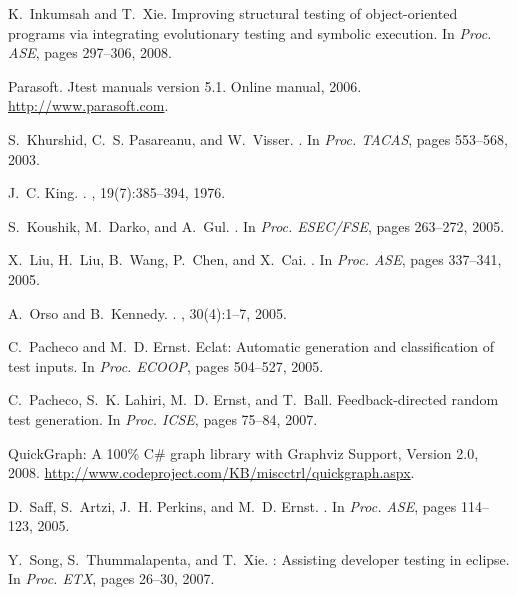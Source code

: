 \documentclass{sig-alternate}
\begin{document}
\begin{thebibliography}{10}
K.~Inkumsah and T.~Xie.
\newblock Improving structural testing of object-oriented programs via
  integrating evolutionary testing and symbolic execution.
\newblock In {\em Proc. ASE}, pages 297--306, 2008.

\vfill\eject

Parasoft. {J}test manuals version 5.1. {O}nline manual, 2006.
\newblock \url{http://www.parasoft.com}.

S.~Khurshid, C.~S. Pasareanu, and W.~Visser.
.
\newblock In {\em Proc. TACAS}, pages 553--568, 2003.

J.~C. King.
.
, 19(7):385--394, 1976.

S.~Koushik, M.~Darko, and A.~Gul.
.
\newblock In {\em Proc. ESEC/FSE}, pages 263--272, 2005.

X.~Liu, H.~Liu, B.~Wang, P.~Chen, and X.~Cai.
.
\newblock In {\em Proc. ASE}, pages 337--341, 2005.

A.~Orso and B.~Kennedy.
.
, 30(4):1--7, 2005.

C.~Pacheco and M.~D. Ernst.
\newblock Eclat: Automatic generation and classification of test inputs.
\newblock In {\em Proc. ECOOP}, pages 504--527, 2005.

C.~Pacheco, S.~K. Lahiri, M.~D. Ernst, and T.~Ball.
\newblock Feedback-directed random test generation.
\newblock In {\em Proc. ICSE}, pages 75--84, 2007.

{QuickGraph: A 100\% C\# graph library with Graphviz Support, Version 2.0},
  2008.
\newblock \url{http://www.codeproject.com/KB/miscctrl/quickgraph.aspx}.

D.~Saff, S.~Artzi, J.~H. Perkins, and M.~D. Ernst.
.
\newblock In {\em Proc. ASE}, pages 114--123, 2005.

Y.~Song, S.~Thummalapenta, and T.~Xie.
: Assisting developer testing in eclipse.
\newblock In {\em Proc. ETX}, pages 26--30, 2007.


\end{thebibliography}
\end{document}
